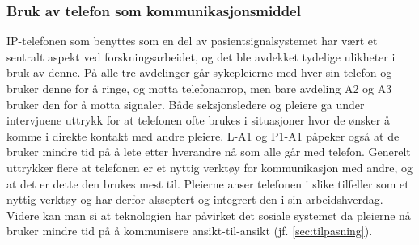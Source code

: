 \subsubsection{Bruk av telefon som kommunikasjonsmiddel}
IP-telefonen som benyttes som en del av pasientsignalsystemet har vært et sentralt aspekt ved forskningsarbeidet, og det ble avdekket tydelige ulikheter i bruk av denne. På alle tre avdelinger går sykepleierne med hver sin telefon og bruker denne for å ringe, og motta telefonanrop, men bare avdeling A2 og A3 bruker den for å motta signaler. Både seksjonsledere og pleiere ga under intervjuene uttrykk for at telefonen ofte brukes i situasjoner hvor de ønsker å komme i direkte kontakt med andre pleiere. L-A1 og P1-A1 påpeker også at de bruker mindre tid på å lete etter hverandre nå som alle går med telefon. Generelt uttrykker flere at telefonen er et nyttig verktøy for kommunikasjon med andre, og at det er dette den brukes mest til. Pleierne anser telefonen i slike tilfeller som et nyttig verktøy og har derfor akseptert og integrert den i sin arbeidshverdag. Videre kan man si at teknologien har påvirket det sosiale systemet da pleierne nå bruker mindre tid på å kommunisere ansikt-til-ansikt (jf. \ref{sec:tilpasning}).

